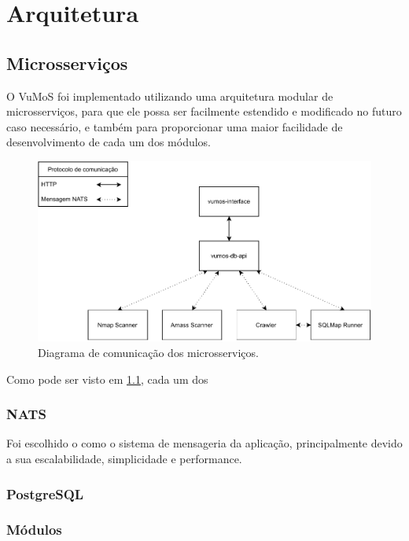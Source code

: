 \chapter{Arquitetura}
\label{cap:arquitetura}

\section{Microsserviços}

    O VuMoS foi implementado utilizando uma arquitetura modular de microsserviços, para que ele possa ser facilmente estendido e modificado no futuro caso necessário, e também para proporcionar uma maior facilidade de desenvolvimento de cada um dos módulos.
    
    \begin{figure}
        \includegraphics[scale=0.8]{figuras/vumos-Microservices.pdf}
        \caption{Diagrama de comunicação dos microsserviços.\label{fig:microservices}}
    \end{figure}
    
    Como pode ser visto em \ref{fig:microservices}, cada um dos 
    
    \subsection{NATS}
    
    Foi escolhido o \cite{NATS} como o sistema de mensageria da aplicação, principalmente devido a sua escalabilidade, simplicidade e performance. 
    
    
    
    \subsection{PostgreSQL}
    \subsection{Módulos}
        
